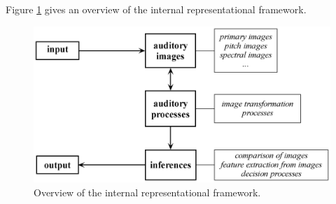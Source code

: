 Figure \ref{Fig:ConceptualFramework} gives an overview of the
internal representational framework.
\begin{figure}[h]
    \centering
    \includegraphics[width=\IPEMDefaultFigureWidth]{Graphics/ConceptualFramework}
    \caption{Overview of the internal representational framework.}
    \label{Fig:ConceptualFramework}
\end{figure}
